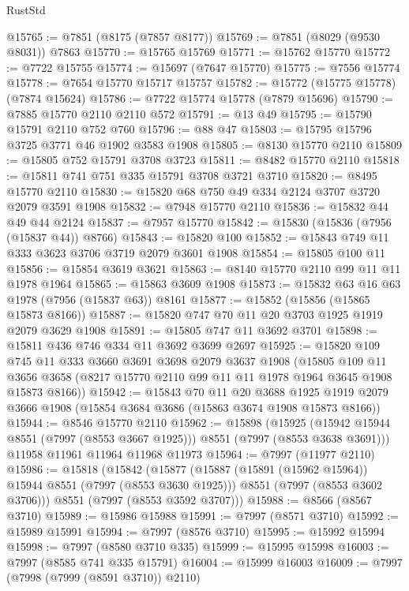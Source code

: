 \begin{lexlean}{RustStd}
\begin{coremodule}
@15765 := @7851 (@8175 (@7857 @8177))
@15769 := @7851 (@8029 (@9530 @8031)) @7863
@15770 := @15765 @15769
@15771 := @15762 @15770
@15772 := @7722 @15755
@15774 := @15697 (@7647 @15770)
@15775 := @7556 @15774
@15778 := @7654 @15770 @15717 @15757
@15782 := @15772 (@15775 @15778) (@7874 @15624)
@15786 := @7722 @15774 @15778 (@7879 @15696)
@15790 := @7885 @15770 @2110 @2110 @572
@15791 := @13 @49
@15795 := @15790 @15791 @2110 @752 @760
@15796 := @88 @47
@15803 := @15795 @15796 @3725 @3771 @46 @1902 @3583 @1908
@15805 := @8130 @15770 @2110
@15809 := @15805 @752 @15791 @3708 @3723
@15811 := @8482 @15770 @2110
@15818 := @15811 @741 @751 @335 @15791 @3708 @3721 @3710
@15820 := @8495 @15770 @2110
@15830 := @15820 @68 @750 @49 @334 @2124 @3707 @3720 @2079 @3591 @1908
@15832 := @7948 @15770 @2110
@15836 := @15832 @44 @49 @44 @2124
@15837 := @7957 @15770
@15842 := @15830 (@15836 (@7956 (@15837 @44)) @8766)
@15843 := @15820 @100
@15852 := @15843 @749 @11 @333 @3623 @3706 @3719 @2079 @3601 @1908
@15854 := @15805 @100 @11
@15856 := @15854 @3619 @3621
@15863 := @8140 @15770 @2110 @99 @11 @11 @1978 @1964
@15865 := @15863 @3609 @1908
@15873 := @15832 @63 @16 @63 @1978 (@7956 (@15837 @63)) @8161
@15877 := @15852 (@15856 (@15865 @15873 @8166))
@15887 := @15820 @747 @70 @11 @20 @3703 @1925 @1919 @2079 @3629 @1908
@15891 := @15805 @747 @11 @3692 @3701
@15898 := @15811 @436 @746 @334 @11 @3692 @3699 @2697
@15925 := @15820
    @109
    @745
    @11
    @333
    @3660
    @3691
    @3698
    @2079
    @3637
    @1908
    (@15805
      @109
      @11
      @3656
      @3658
      (@8217 @15770 @2110 @99 @11 @11 @1978 @1964 @3645 @1908 @15873 @8166))
@15942 := @15843
    @70
    @11
    @20
    @3688
    @1925
    @1919
    @2079
    @3666
    @1908
    (@15854 @3684 @3686 (@15863 @3674 @1908 @15873 @8166))
@15944 := @8546 @15770 @2110
@15962 := @15898
    (@15925 (@15942 @15944 @8551 (@7997 (@8553 @3667 @1925))) @8551 (@7997 (@8553 @3638 @3691)))
    @11958
    @11961
    @11964
    @11968
    @11973
@15964 := @7997 (@11977 @2110)
@15986 := @15818
    (@15842
      (@15877
        (@15887 (@15891 (@15962 @15964)) @15944 @8551 (@7997 (@8553 @3630 @1925)))
        @8551
        (@7997 (@8553 @3602 @3706)))
      @8551
      (@7997 (@8553 @3592 @3707)))
@15988 := @8566 (@8567 @3710)
@15989 := @15986 @15988
@15991 := @7997 (@8571 @3710)
@15992 := @15989 @15991
@15994 := @7997 (@8576 @3710)
@15995 := @15992 @15994
@15998 := @7997 (@8580 @3710 @335)
@15999 := @15995 @15998
@16003 := @7997 (@8585 @741 @335 @15791)
@16004 := @15999 @16003
@16009 := @7997 (@7998 (@7999 (@8591 @3710)) @2110)

\end{coremodule}
\end{lexlean}
